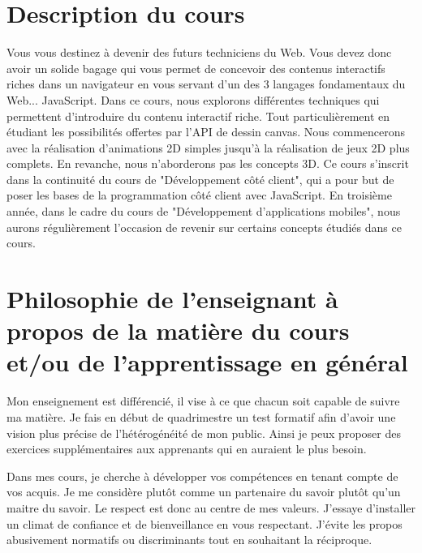 \section{Description du cours}

Vous vous destinez à devenir des futurs techniciens du Web. Vous devez donc avoir un solide bagage qui vous permet de concevoir des contenus interactifs riches dans un navigateur en vous servant d’un des 3 langages fondamentaux du Web... JavaScript. Dans ce cours, nous explorons différentes techniques qui permettent d’introduire du contenu interactif riche. Tout particulièrement en étudiant les possibilités offertes par l’API de dessin canvas. Nous commencerons avec la réalisation d’animations 2D simples jusqu’à la réalisation de jeux 2D plus complets. En revanche, nous n’aborderons pas les concepts 3D.
Ce cours s’inscrit dans la continuité du cours de "Développement côté client", qui a pour but de poser les bases de la programmation côté client avec JavaScript. En troisième année, dans le cadre du cours de "Développement d'applications mobiles", nous aurons régulièrement l’occasion de revenir sur certains concepts étudiés dans ce cours.
\clearpage
\section{Philosophie de l’enseignant à propos de la matière du cours et/ou de l’apprentissage en général}

Mon enseignement est différencié, il vise à ce que chacun soit capable de suivre ma matière. Je fais en début de quadrimestre un test formatif afin d’avoir une vision plus précise de l’hétérogénéité de mon public. Ainsi je peux proposer des exercices supplémentaires aux apprenants qui en auraient le plus besoin.\cite{lawrence2004differentiated}

Dans mes cours, je cherche à développer vos compétences en tenant compte de vos acquis. Je me considère plutôt comme un partenaire du savoir plutôt qu'un maitre du savoir. Le respect est donc au centre de mes valeurs. J’essaye d’installer un climat de confiance et de bienveillance en vous respectant. J'évite les propos abusivement normatifs ou discriminants tout en souhaitant la réciproque.

